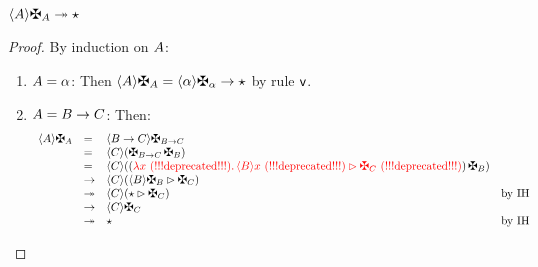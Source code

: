 \begin{lemma}
\label{lem:generate_verify}
$\verif{\typ}{\gen{\typ}} \tos \iunit$
\end{lemma}
\begin{proof}
By induction on $A$:
\begin{enumerate}
\item $A = \alpha$:
  Then
  $\verif{\typ}{\gen{\typ}}
  = \verifbtyp{\genbtyp}
  \to \iunit$ by rule $\mathsf{v}$.
\item $A = B \to C$:
  Then:
  \[
    \begin{array}{rlll}
      \verif{\typ}{\gen{\typ}}
    & = &
      \verif{\typtwo\to\typthree}{\gen{\typtwo\to\typthree}}
    \\
    & = &
      \verif{\typthree}{(\gen{\typtwo\to\typthree}\,\gen{\typtwo})}
    \\
    & = &
      \verif{\typthree}{((\lam{\var}{\eunit{\verif{\typtwo}{\var}}{\gen{\typthree}}})\,\gen{\typtwo})}
    \\
    & \to &
      \verif{\typthree}{(\eunit{\verif{\typtwo}{\gen{\typtwo}}}{\gen{\typthree}})}
    \\
    & \tos &
      \verif{\typthree}{(\eunit{\iunit}{\gen{\typthree}})}
      & \text{by \ih}
    \\
    & \to &
      \verif{\typthree}{\gen{\typthree}}
    \\
    & \tos &
      \iunit
      & \text{by \ih}
    \end{array}
  \]
\end{enumerate}
\end{proof}

